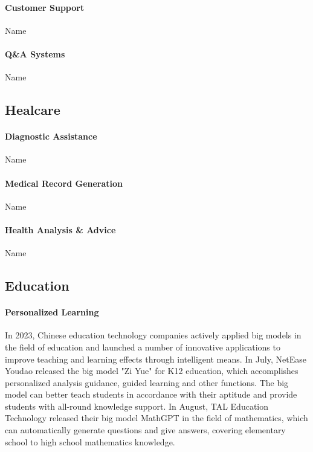 \documentclass[fleqn,10pt]{SelfArx} %
\begin{document}
\paragraph{Customer Support} Name %

\paragraph{Q\&A Systems} Name %

\subsection{Healcare}

\paragraph{Diagnostic Assistance} Name %

\paragraph{Medical Record Generation} Name %

\paragraph{Health Analysis \& Advice} Name %


\subsection{Education}

\paragraph{Personalized Learning} In 2023, Chinese education technology companies actively applied big models in the field of education and launched a number of innovative applications to improve teaching and learning effects through intelligent means. In July, NetEase Youdao released the big model "Zi Yue" for K12 education, which accomplishes personalized analysis guidance, guided learning and other functions. The big model can better teach students in accordance with their aptitude and provide students with all-round knowledge support. In August, TAL Education Technology released their big model MathGPT in the field of mathematics, which can automatically generate questions and give answers, covering elementary school to high school mathematics knowledge. 
\end{document}
